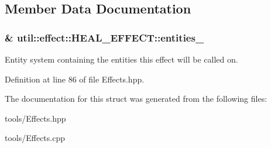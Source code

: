 \subsection{Member Data Documentation}
\subsubsection[{\texorpdfstring{entities\+\_\+}{entities_}}]{\& util\+::effect\+::\+H\+E\+A\+L\+\_\+\+E\+F\+F\+E\+C\+T\+::entities\+\_\+\hspace{0.3cm}{\ttfamily [private]}}\hypertarget{structutil_1_1effect_1_1_h_e_a_l___e_f_f_e_c_t_a6e7bfe3f3e1605de6bbb52f21de56b49}{}\label{structutil_1_1effect_1_1_h_e_a_l___e_f_f_e_c_t_a6e7bfe3f3e1605de6bbb52f21de56b49}


Entity system containing the entities this effect will be called on. 



Definition at line 86 of file Effects.\+hpp.



The documentation for this struct was generated from the following files\+:\begin{DoxyCompactItemize}
\item 
tools/Effects.\+hpp\item 
tools/Effects.\+cpp\end{DoxyCompactItemize}
